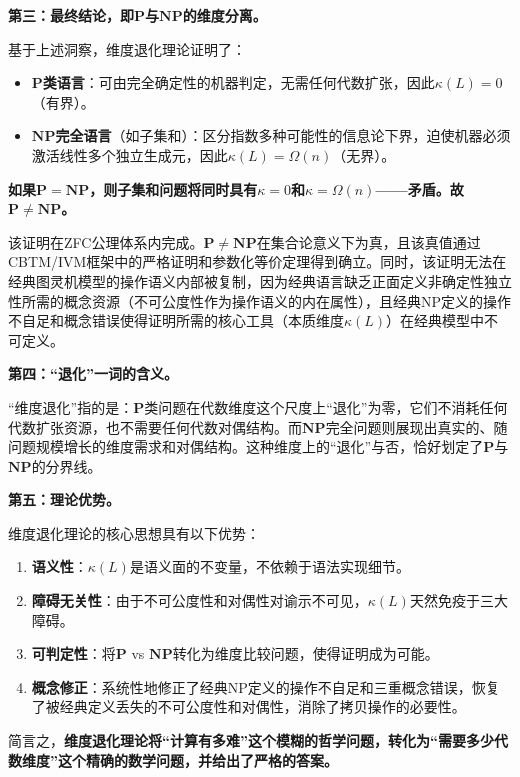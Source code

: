 \documentclass{ctexart}
\begin{document}
	\textbf{第三：最终结论，即$\mathbf{P}$与$\mathbf{NP}$的维度分离。}
	
	基于上述洞察，维度退化理论证明了：
	
	\begin{itemize}
		\item \textbf{$\mathbf{P}$类语言}：可由完全确定性的机器判定，无需任何代数扩张，因此$\kappa(L) = 0$（有界）。
		\item \textbf{$\mathbf{NP}$完全语言}（如子集和）：区分指数多种可能性的信息论下界，迫使机器必须激活线性多个独立生成元，因此$\kappa(L) = \Omega(n)$（无界）。
	\end{itemize}
	
	\textbf{如果$\mathbf{P} = \mathbf{NP}$，则子集和问题将同时具有$\kappa = 0$和$\kappa = \Omega(n)$——矛盾。故$\mathbf{P} \neq \mathbf{NP}$。}
	
	该证明在ZFC公理体系内完成。$\mathbf{P}\neq\mathbf{NP}$在集合论意义下为真，且该真值通过CBTM/IVM框架中的严格证明和参数化等价定理得到确立。同时，该证明无法在经典图灵机模型的操作语义内部被复制，因为经典语言缺乏正面定义非确定性独立性所需的概念资源（不可公度性作为操作语义的内在属性），且经典NP定义的操作不自足和概念错误使得证明所需的核心工具（本质维度$\kappa(L)$）在经典模型中不可定义。
	
	\textbf{第四：``退化''一词的含义。}
	
	``维度退化''指的是：$\mathbf{P}$类问题在代数维度这个尺度上``退化''为零，它们不消耗任何代数扩张资源，也不需要任何代数对偶结构。而$\mathbf{NP}$完全问题则展现出真实的、随问题规模增长的维度需求和对偶结构。这种维度上的``退化''与否，恰好划定了$\mathbf{P}$与$\mathbf{NP}$的分界线。
	
	\textbf{第五：理论优势。}
	
	维度退化理论的核心思想具有以下优势：
	\begin{enumerate}
		\item \textbf{语义性}：$\kappa(L)$是语义面的不变量，不依赖于语法实现细节。
		\item \textbf{障碍无关性}：由于不可公度性和对偶性对谕示不可见，$\kappa(L)$天然免疫于三大障碍。
		\item \textbf{可判定性}：将$\mathbf{P}$ vs $\mathbf{NP}$转化为维度比较问题，使得证明成为可能。
		\item \textbf{概念修正}：系统性地修正了经典NP定义的操作不自足和三重概念错误，恢复了被经典定义丢失的不可公度性和对偶性，消除了拷贝操作的必要性。
	\end{enumerate}
	
	简言之，\textbf{维度退化理论将``计算有多难''这个模糊的哲学问题，转化为``需要多少代数维度''这个精确的数学问题，并给出了严格的答案。}
	
\end{document}
